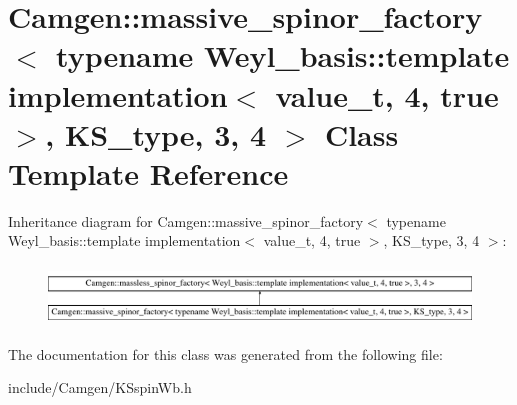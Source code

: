\hypertarget{a00353}{}\section{Camgen\+:\+:massive\+\_\+spinor\+\_\+factory$<$ typename Weyl\+\_\+basis\+:\+:template implementation$<$ value\+\_\+t, 4, true $>$, K\+S\+\_\+type, 3, 4 $>$ Class Template Reference}
\label{a00353}
Inheritance diagram for Camgen\+:\+:massive\+\_\+spinor\+\_\+factory$<$ typename Weyl\+\_\+basis\+:\+:template implementation$<$ value\+\_\+t, 4, true $>$, K\+S\+\_\+type, 3, 4 $>$\+:\begin{figure}[H]
\begin{center}
\leavevmode
\includegraphics[height=1.618497cm]{a00353}
\end{center}
\end{figure}


The documentation for this class was generated from the following file\+:\begin{DoxyCompactItemize}
\item 
include/\+Camgen/K\+Sspin\+Wb.\+h\end{DoxyCompactItemize}
